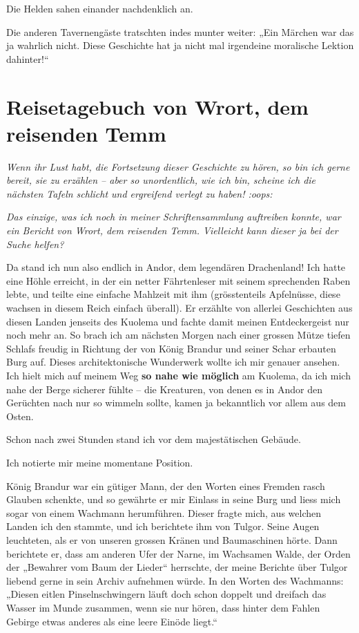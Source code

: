 Die Helden sahen einander nachdenklich an.

Die anderen Tavernengäste tratschten indes munter weiter: „Ein Märchen war das ja wahrlich nicht. Diese Geschichte hat ja nicht mal irgendeine moralische Lektion dahinter!“


\newpage
\section{Reisetagebuch von Wrort, dem reisenden Temm}


\textit{Wenn ihr Lust habt, die Fortsetzung dieser Geschichte zu hören, so bin ich gerne bereit, sie zu erzählen – aber so unordentlich, wie ich bin, scheine ich die nächsten Tafeln schlicht und ergreifend verlegt zu haben! :oops:}

\textit{Das einzige, was ich noch in meiner Schriftensammlung auftreiben konnte, war ein Bericht von Wrort, dem reisenden Temm. Vielleicht kann dieser ja bei der Suche helfen?}\bigskip



Da stand ich nun also endlich in Andor, dem legendären Drachenland! Ich hatte eine Höhle erreicht, in der ein netter Fährtenleser mit seinem sprechenden Raben lebte, und teilte eine einfache Mahlzeit mit ihm (grösstenteils Apfelnüsse, diese wachsen in diesem Reich einfach überall). Er erzählte von allerlei Geschichten aus diesen Landen jenseits des Kuolema und fachte damit meinen Entdeckergeist nur noch mehr an. So brach ich am nächsten Morgen nach einer grossen Mütze tiefen Schlafs freudig in Richtung der von König Brandur und seiner Schar erbauten Burg auf. Dieses architektonische Wunderwerk wollte ich mir genauer ansehen. Ich hielt mich auf meinem Weg \textbf{so nahe wie möglich} am Kuolema, da ich mich nahe der Berge sicherer fühlte – die Kreaturen, von denen es in Andor den Gerüchten nach nur so wimmeln sollte, kamen ja bekanntlich vor allem aus dem Osten.

Schon nach zwei Stunden stand ich vor dem majestätischen Gebäude.

Ich notierte mir meine momentane Position.\bigskip



König Brandur war ein gütiger Mann, der den Worten eines Fremden rasch Glauben schenkte, und so gewährte er mir Einlass in seine Burg und liess mich sogar von einem Wachmann herumführen. Dieser fragte mich, aus welchen Landen ich den stammte, und ich berichtete ihm von Tulgor. Seine Augen leuchteten, als er von unseren grossen Kränen und Baumaschinen hörte. Dann berichtete er, dass am anderen Ufer der Narne, im Wachsamen Walde, der Orden der „Bewahrer vom Baum der Lieder“ herrschte, der meine Berichte über Tulgor liebend gerne in sein Archiv aufnehmen würde. In den Worten des Wachmanns: „Diesen eitlen Pinselnschwingern läuft doch schon doppelt und dreifach das Wasser im Munde zusammen, wenn sie nur hören, dass hinter dem Fahlen Gebirge etwas anderes als eine leere Einöde liegt.“

